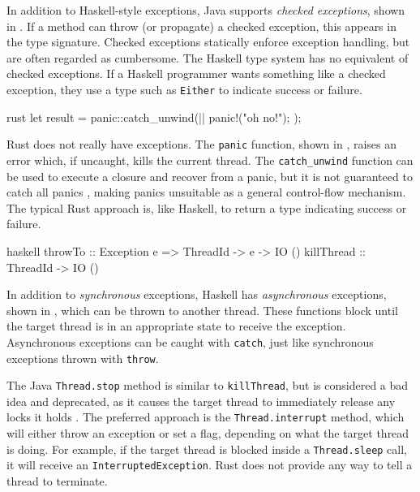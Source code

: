 In addition to Haskell-style exceptions, Java supports \emph{checked
  exceptions}, shown in .  If a method can throw
(or propagate) a checked exception, this appears in the type
signature.  Checked exceptions statically enforce exception handling,
but are often regarded as cumbersome.  The Haskell type system has no
equivalent of checked exceptions.  If a Haskell programmer wants
something like a checked exception, they use a type such as
\verb|Either| to indicate success or failure.

\begin{listing}
\centering
\begin{cminted}{rust}
let result = panic::catch_unwind(|| {
    panic!("oh no!");
});
\end{cminted}
\caption{Panics in Rust.}\label{lst:excs_rust}
\end{listing}

Rust does not really have exceptions.  The \verb|panic| function,
shown in , raises an error which, if uncaught,
kills the current thread.  The \verb|catch_unwind| function can be
used to execute a closure and recover from a panic, but it is not
guaranteed to catch all panics \parencite{catch_unwind}, making panics
unsuitable as a general control-flow mechanism.  The typical Rust
approach is, like Haskell, to return a type indicating success or
failure.

\begin{listing}
\centering
\begin{cminted}{haskell}
throwTo    :: Exception e => ThreadId -> e -> IO ()
killThread :: ThreadId -> IO ()
\end{cminted}
\caption{Asynchronous exceptions in Haskell.}\label{lst:excsa_haskell}
\end{listing}

In addition to \emph{synchronous} exceptions, Haskell has
\emph{asynchronous} exceptions, shown in ,
which can be thrown to another thread.  These functions block until
the target thread is in an appropriate state to receive the exception.
Asynchronous exceptions can be caught with \verb|catch|, just like
synchronous exceptions thrown with \verb|throw|.

The Java \verb|Thread.stop| method is similar to \verb|killThread|,
but is considered a bad idea and deprecated, as it causes the target
thread to immediately release any locks it holds \parencite{oracle2017}.
The preferred approach is the \verb|Thread.interrupt| method, which
will either throw an exception or set a flag, depending on what the
target thread is doing.  For example, if the target thread is blocked
inside a \verb|Thread.sleep| call, it will receive an
\verb|InterruptedException|.  Rust does not provide any way to tell a
thread to terminate.

